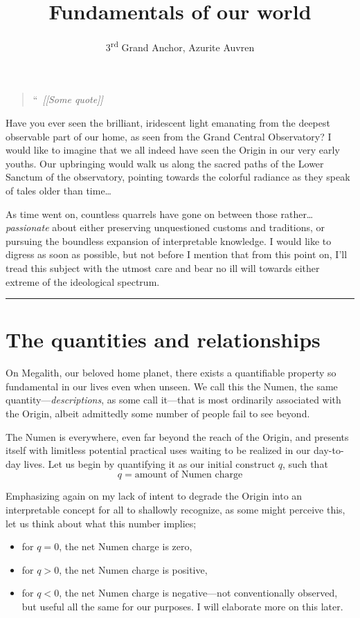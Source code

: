 \documentclass[11pt,a4paper]{article}
\title{Fundamentals of our world}
\author{3\textsuperscript{rd} Grand Anchor, Azurite Auvren}
\date{}
\newcommand{\sectionbreak}{
	\par\bigskip
	\noindent\rule{\linewidth}{0.4pt}
	\par\bigskip
}
\begin{document}
	\maketitle
	
	\begin{quote}
		\large
		{\Huge\color{gray}``}\,
		\textit{
			[[Some quote]]
		}
	\end{quote}
	
	Have you ever seen the brilliant, iridescent light emanating from the deepest observable part of our home, as seen from the Grand Central Observatory? I would like to imagine that we all indeed have seen the Origin in our very early youths. Our upbringing would walk us along the sacred paths of the Lower Sanctum of the observatory, pointing towards the colorful radiance as they speak of tales older than time\ldots
	
	As time went on, countless quarrels have gone on between those rather\ldots \emph{passionate} about either preserving unquestioned customs and traditions, or pursuing the boundless expansion of interpretable knowledge. I would like to digress as soon as possible, but not before I mention that from this point on, I'll tread this subject with the utmost care and bear no ill will towards either extreme of the ideological spectrum.
	
	\sectionbreak
	
	\section{The quantities and relationships}
	
	On Megalith, our beloved home planet, there exists a quantifiable property so fundamental in our lives even when unseen. We call this the Numen, the same quantity---\emph{descriptions}, as some call it---that is most ordinarily associated with the Origin, albeit admittedly some number of people fail to see beyond.
	
	The Numen is everywhere, even far beyond the reach of the Origin, and presents itself with limitless potential practical uses waiting to be realized in our day-to-day lives. Let us begin by quantifying it as our initial construct \(q\), such that
	\begin{equation}
	q = \text{amount of Numen charge}
	\end{equation}
	
	Emphasizing again on my lack of intent to degrade the Origin into an interpretable concept for all to shallowly recognize, as some might perceive this, let us think about what this number implies;
	\begin{itemize}
		\item for \(q = 0\), the net Numen charge is zero,
		\item for \(q > 0\), the net Numen charge is positive,
		\item for \(q < 0\), the net Numen charge is negative---not conventionally observed, but useful all the same for our purposes. I will elaborate more on this later.
	\end{itemize}
	
\end{document}
